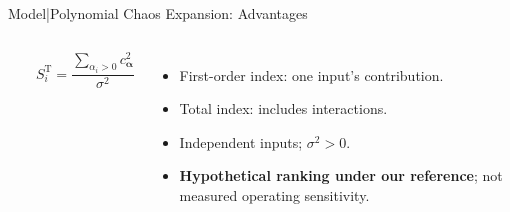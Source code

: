 \begin{frame}{Model\enspace|\enspace Polynomial Chaos Expansion: Advantages}
\begin{columns}[T,onlytextwidth]
{\begin{minipage}[t][40mm][t]{\dimexpr\linewidth-2\fboxsep-2\fboxrule\relax}
\[            \qquad
            S_i^{\mathrm T}=\frac{\sum_{\alpha_i>0}c_{\boldsymbol\alpha}^{2}}{\sigma^2}
          \]
          \begin{itemize}
            \setlength{\itemsep}{1pt}
            \item First-order index: one input's contribution.
            \item Total index: includes interactions.
            \item Independent inputs; $\sigma^2>0$.
            \item \textbf{Hypothetical ranking under our reference}; not measured operating sensitivity.
          \end{itemize}
        \end{minipage}%
      }
  \end{columns}
  \medskip
\end{frame}
